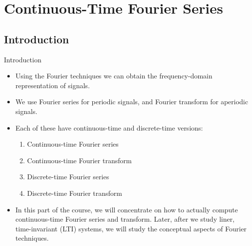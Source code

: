 \section{Continuous-Time Fourier Series}

\subsection{Introduction}
\begin{frame}{Introduction}
    \begin{itemize}[<+->]
      \item Using the Fourier techniques we can obtain the frequency-domain representation of signals.
      \item We use Fourier series for periodic signals, and Fourier transform for aperiodic signals.
      \item Each of these have continuous-time and discrete-time versions:
        \begin{enumerate}
            \item Continuous-time Fourier series
            \item Continuous-time Fourier transform
            \item Discrete-time Fourier series
            \item Discrete-time Fourier transform
        \end{enumerate}
      \item In this part of the course, we will concentrate on how to actually compute continuous-time Fourier series and transform. Later, after we study liner, time-invariant (LTI) systems, we will study the conceptual aspects of Fourier techniques.
    \end{itemize}
\end{frame}

